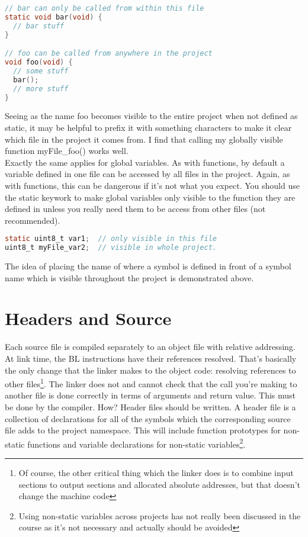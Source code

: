\begin{lstlisting}[language=C]
// bar can only be called from within this file
static void bar(void) {
  // bar stuff
}

// foo can be called from anywhere in the project
void foo(void) {
  // some stuff
  bar();
  // more stuff
}
\end{lstlisting}

Seeing as the name foo becomes visible to the entire project when not defined as static, it may be helpful to prefix it with something characters to make it clear which file in the project it comes from. I find that calling my globally visible function myFile\_foo() works well. \\

Exactly the same applies for global variables. As with functions, by default a variable defined in one file can be accessed by all files in the project. Again, as with functions, this can be dangerous if it's not what you expect. You should use the static keywork to make global variables only visible to the function they are defined in unless you really need them to be access from other files (not recommended).

\begin{lstlisting}[language=C]
static uint8_t var1;  // only visible in this file
uint8_t myFile_var2;  // visible in whole project.
\end{lstlisting}

The idea of placing the name of where a symbol is defined in front of a symbol name which is visible throughout the project is demonstrated above. 

\section{Headers and Source}
Each source file is compiled separately to an object file with relative addressing.
At link time, the BL instructions have their references resolved. That's basically the only change that the linker makes to the object code: resolving references to other files\footnote{Of course, the other critical thing which the linker does is to combine input sections to output sections and allocated absolute addresses, but that doesn't change the machine code}.
The linker does not and cannot check that the call you're making to another file is done correctly in terms of arguments and return value.
This must be done by the compiler. How?
Header files should be written. A header file is a collection of declarations for all of the symbols which the corresponding source file adds to the project namespace.
This will include function prototypes for non-static functions and variable declarations for non-static variables\footnote{Using non-static variables across projects has not really been discussed in the course as it's not necessary and actually should be avoided}. 

